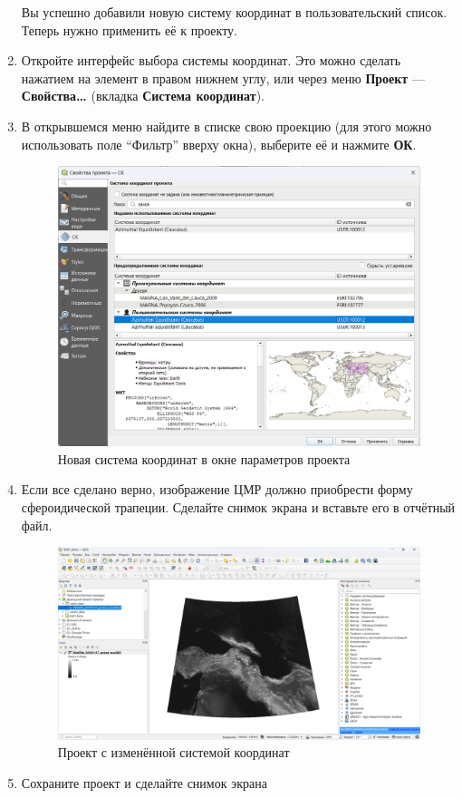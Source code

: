 \documentclass[
  12pt,
]{book}
\begin{document}
\begin{enumerate}
  Вы успешно добавили новую систему координат в пользовательский список. Теперь нужно применить её к проекту.
\item
  Откройте интерфейс выбора системы координат. Это можно сделать нажатием на элемент в правом нижнем углу, или через меню \textbf{Проект} --- \textbf{Свойства\ldots{}} (вкладка \textbf{Система координат}).
\item
  В открывшемся меню найдите в списке свою проекцию (для этого можно использовать поле ``Фильтр'' вверху окна), выберите её и нажмите \textbf{ОК}.

  \begin{figure}
  \centering
  \includegraphics{images/Ex01_MapGeneral/NewCRS_window.png}
  \caption{Новая система координат в окне параметров проекта}
  \end{figure}
\item
  Если все сделано верно, изображение ЦМР должно приобрести форму сфероидической трапеции. Сделайте снимок экрана и вставьте его в отчётный файл.

  \begin{figure}
  \centering
  \includegraphics{images/Ex01_MapGeneral/screen2.png}
  \caption{Проект с изменённой системой координат}
  \end{figure}
\item
  Сохраните проект и сделайте снимок экрана
\end{enumerate}
\end{document}
